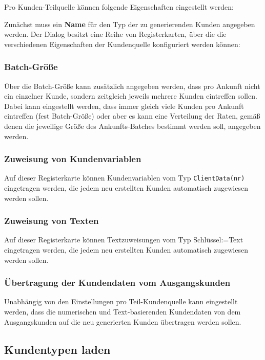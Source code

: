 Pro Kunden-Teilquelle können folgende Eigenschaften eingestellt werden: 

Zunächst muss ein \textbf{Name} für den Typ der zu generierenden Kunden angegeben werden.
Der Dialog besitzt eine Reihe von Registerkarten, über die die verschiedenen Eigenschaften
der Kundenquelle konfiguriert werden können:

\subsubsection*{Batch-Größe}

Über die Batch-Größe kann zusätzlich
angegeben werden, dass pro Ankunft nicht ein einzelner Kunde, sondern zeitgleich jeweils
mehrere Kunden eintreffen sollen. Dabei kann eingestellt werden, dass immer gleich
viele Kunden pro Ankunft eintreffen (fest Batch-Größe) oder aber es kann eine Verteilung
der Raten, gemäß denen die jeweilige Größe des Ankunfts-Batches bestimmt werden soll,
angegeben werden.

\subsubsection*{Zuweisung von Kundenvariablen}

Auf dieser Registerkarte können Kundenvariablen vom Typ \texttt{ClientData(nr)} eingetragen werden,
die jedem neu erstellten Kunden automatisch zugewiesen werden sollen.

\subsubsection*{Zuweisung von Texten}

Auf dieser Registerkarte können Textzuweisungen vom Typ Schlüssel:=Text eingetragen werden,
die jedem neu erstellten Kunden automatisch zugewiesen werden sollen.

\subsubsection*{Übertragung der Kundendaten vom Ausgangskunden}

Unabhängig von den Einstellungen pro Teil-Kundenquelle kann eingestellt werden,
dass die numerischen und Text-basierenden Kundendaten von dem Ausgangskunden
auf die neu generierten Kunden übertragen werden sollen.

\subsection*{Kundentypen laden}

